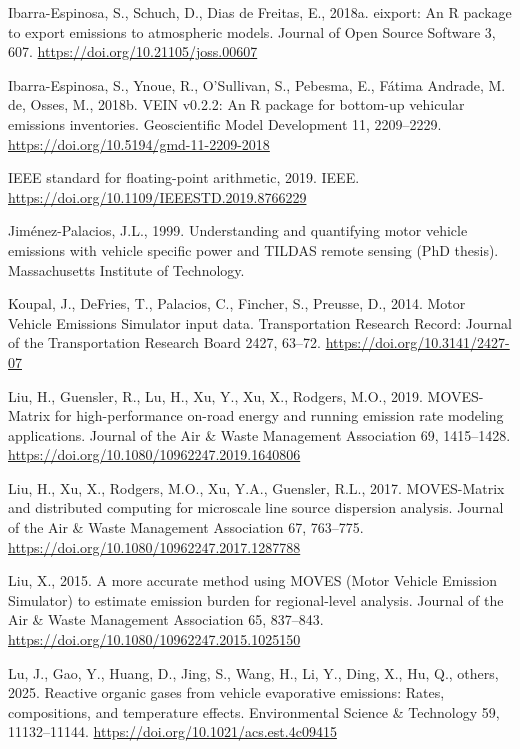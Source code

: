 \documentclass[preprint,
3p]{elsarticle} %
\newlength{\cslhangindent}
\newenvironment{CSLReferences}[2] %
 {\begin{list}{}{%
  \setlength{\itemindent}{0pt}
  \setlength{\leftmargin}{0pt}
  \setlength{\parsep}{0pt}
  \ifodd #1
   \setlength{\leftmargin}{\cslhangindent}
   \setlength{\itemindent}{-1\cslhangindent}
  \fi
  \setlength{\itemsep}{#2\baselineskip}}}
 {\end{list}}
\begin{document}
\begin{CSLReferences}{1}{0}
Ibarra-Espinosa, S., Schuch, D., Dias de Freitas, E., 2018a. {eixport}:
An {R} package to export emissions to atmospheric models. Journal of
Open Source Software 3, 607. \url{https://doi.org/10.21105/joss.00607}

Ibarra-Espinosa, S., Ynoue, R., O'Sullivan, S., Pebesma, E., Fátima
Andrade, M. de, Osses, M., 2018b. {VEIN} v0.2.2: An {R} package for
bottom-up vehicular emissions inventories. Geoscientific Model
Development 11, 2209--2229.
\url{https://doi.org/10.5194/gmd-11-2209-2018}

{IEEE} standard for floating-point arithmetic, 2019. {IEEE}.
\url{https://doi.org/10.1109/IEEESTD.2019.8766229}

Jiménez-Palacios, J.L., 1999. Understanding and quantifying motor
vehicle emissions with vehicle specific power and {TILDAS} remote
sensing (PhD thesis). Massachusetts Institute of Technology.

Koupal, J., DeFries, T., Palacios, C., Fincher, S., Preusse, D., 2014.
{Motor Vehicle Emissions Simulator} input data. Transportation Research
Record: Journal of the Transportation Research Board 2427, 63--72.
\url{https://doi.org/10.3141/2427-07}

Liu, H., Guensler, R., Lu, H., Xu, Y., Xu, X., Rodgers, M.O., 2019.
{MOVES-Matrix} for high-performance on-road energy and running emission
rate modeling applications. Journal of the Air \& Waste Management
Association 69, 1415--1428.
\url{https://doi.org/10.1080/10962247.2019.1640806}

Liu, H., Xu, X., Rodgers, M.O., Xu, Y.A., Guensler, R.L., 2017.
{MOVES-Matrix} and distributed computing for microscale line source
dispersion analysis. Journal of the Air \& Waste Management Association
67, 763--775. \url{https://doi.org/10.1080/10962247.2017.1287788}

Liu, X., 2015. A more accurate method using {MOVES} ({Motor Vehicle
Emission Simulator}) to estimate emission burden for regional-level
analysis. Journal of the Air \& Waste Management Association 65,
837--843. \url{https://doi.org/10.1080/10962247.2015.1025150}

Lu, J., Gao, Y., Huang, D., Jing, S., Wang, H., Li, Y., Ding, X., Hu,
Q., others, 2025. Reactive organic gases from vehicle evaporative
emissions: Rates, compositions, and temperature effects. Environmental
Science \& Technology 59, 11132--11144.
\url{https://doi.org/10.1021/acs.est.4c09415}


\end{CSLReferences}
\end{document}
